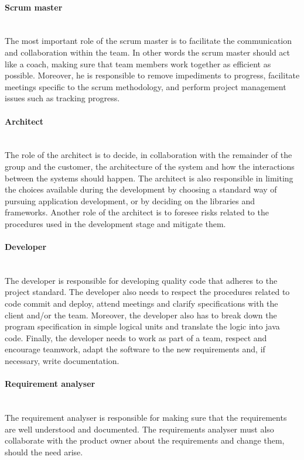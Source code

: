 \documentclass[../document.tex]{subfiles}
\begin{document}
\paragraph{Scrum master} \ \\
The most important role of the scrum master is to facilitate the communication and collaboration within the team. In other words the scrum master should act like a coach, making sure that team members work together as efficient as possible. Moreover, he is responsible to remove impediments to progress, facilitate meetings specific to the scrum methodology, and perform project management issues such as tracking progress. 

\paragraph{Architect} \ \\
The role of the architect is to decide, in collaboration with the remainder of the group and the customer, the architecture of the system and how the interactions between the systems should happen. The architect is also responsible in limiting the choices available during the development by choosing a standard way of pursuing application development, or by deciding on the libraries and frameworks. Another role of the architect is to foresee risks related to the procedures used in the development stage and mitigate them. 

\paragraph{Developer} \ \\
The developer is responsible for developing quality code that adheres to the project standard. The developer also needs to respect the procedures related to code commit and deploy, attend meetings and clarify specifications with the client and/or the team. Moreover, the developer also has to break down the program specification in simple logical units and translate the logic into java code. Finally, the developer needs to work as part of a team, respect and encourage teamwork, adapt the software to the new requirements and, if necessary, write documentation.

\paragraph{Requirement analyser} \ \\
The requirement analyser is responsible for making sure that the requirements are well understood and documented. The requirements analyser must also collaborate with the product owner about the requirements and change them, should the need arise.
\end{document}
